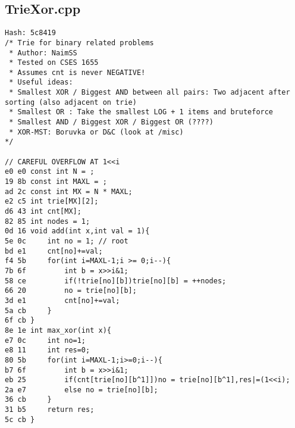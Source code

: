 \documentclass[11pt, a4paper, twoside]{article}
\begin{document}
\subsection{TrieXor.cpp}
\begin{lstlisting}
Hash: 5c8419
/* Trie for binary related problems
 * Author: NaimSS
 * Tested on CSES 1655
 * Assumes cnt is never NEGATIVE!
 * Useful ideas:
 * Smallest XOR / Biggest AND between all pairs: Two adjacent after sorting (also adjacent on trie)
 * Smallest OR : Take the smallest LOG + 1 items and bruteforce
 * Smallest AND / Biggest XOR / Biggest OR (????)
 * XOR-MST: Boruvka or D&C (look at /misc)
*/

// CAREFUL OVERFLOW AT 1<<i
e0 e0 const int N = ;
19 8b const int MAXL = ;
ad 2c const int MX = N * MAXL;
e2 c5 int trie[MX][2];
d6 43 int cnt[MX];
82 85 int nodes = 1;
0d 16 void add(int x,int val = 1){
5e 0c     int no = 1; // root
bd e1     cnt[no]+=val;
f4 5b     for(int i=MAXL-1;i >= 0;i--){
7b 6f         int b = x>>i&1;
58 ce         if(!trie[no][b])trie[no][b] = ++nodes;
66 20         no = trie[no][b];
3d e1         cnt[no]+=val;
5a cb     }
6f cb }
8e 1e int max_xor(int x){
e7 0c     int no=1;
e8 11     int res=0;
80 5b     for(int i=MAXL-1;i>=0;i--){
b7 6f         int b = x>>i&1;
eb 25         if(cnt[trie[no][b^1]])no = trie[no][b^1],res|=(1<<i);
2a e7         else no = trie[no][b];
36 cb     }
31 b5     return res;
5c cb }
\end{lstlisting}
\end{document}
